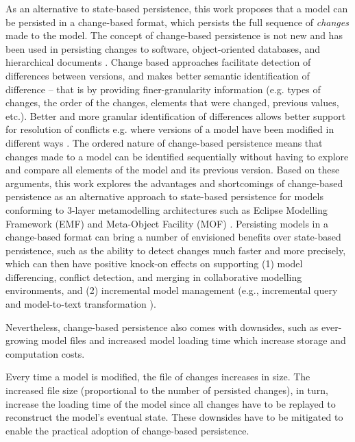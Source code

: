 As an alternative to state-based persistence, this work proposes that a model can be persisted in a change-based format, 
which persists the full sequence of \emph{changes} made to the model. 
The concept of change-based persistence is not new and has been used in persisting changes to software, 
object-oriented databases, and hierarchical documents 
\cite{DBLP:journals/entcs/RobbesL07,DBLP:conf/sde/LippeO92,DBLP:conf/caise/IgnatN05}. Change based approaches facilitate detection of differences between versions, and makes better semantic identification of difference -- that is by providing finer-granularity information (e.g. types of changes, the order of the changes, elements that were changed, previous values, etc.).  Better and more granular identification of differences allows better support for resolution of conflicts e.g. where versions of a model have been modified in different ways \cite{mens2002state}. 
The ordered nature of change-based persistence means that changes made to a model can be identified sequentially without having to explore and compare all elements of the model and its previous version. Based on these arguments, 
this work explores the advantages and shortcomings of change-based persistence as an alternative approach to state-based persistence for models conforming to 3-layer metamodelling architectures such as Eclipse Modelling Framework (EMF) \cite{eclipse2019emf} and Meta-Object Facility (MOF) \cite{omg2018mof}. Persisting models in a change-based format can bring a number of envisioned benefits over state-based persistence, 
such as the ability to detect changes much faster and more precisely, which can then have positive 
knock-on effects on supporting (1) model differencing, conflict detection, and merging in collaborative modelling environments, 
and (2) incremental model management (e.g., incremental query \cite{DBLP:conf/ecmdafa/RathHV12} and 
model-to-text transformation \cite{DBLP:conf/ecmdafa/OgunyomiRK15}). 

Nevertheless, change-based persistence also comes with downsides, such as ever-growing model files 
\cite{DBLP:journals/entcs/RobbesL07,DBLP:conf/edoc/KoegelHLHD10} and increased model loading time \cite{mens2002state}
which increase storage and computation costs. 

Every time a model is modified, the file of changes increases in size. The increased file size (proportional to the number of persisted changes), 
in turn, increase the loading time of the model since all changes have to be replayed to reconstruct the model's 
eventual state. These downsides have to be mitigated to enable the practical adoption of change-based persistence. 

